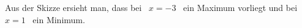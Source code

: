 {\begin{enumerate}
	Aus der Skizze ersieht man, dass bei \ $x=-3$ \ ein Maximum vorliegt und bei \ $x=1$ \ ein Minimum.
\end{enumerate}

% 
}

